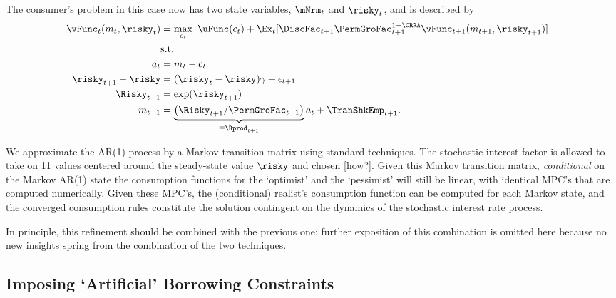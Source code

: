 \documentclass[titlepage, headings=optiontotocandhead]{\econtex}
\begin{document}
The consumer's problem in this case now has two state variables, $\mNrm_{t}$ and $\risky_{t}$, and 
is described by
\begin{equation}\begin{gathered}\begin{aligned}
      \null{\vFunc}_{t}({m}_{t},\risky_{t})  & = \max_{{c}_{t}} ~ \uFunc({c}_{t})+
      \Ex_{t}[{\DiscFac}_{t+1}\PermGroFac_{t+1}^{1-\CRRA}\null{\vFunc}_{t+1}({m}_{t+1},\risky_{t+1})] \label{vtNormRisky}
      \\         & \text{s.t.} &   \nonumber \\
      {a}_{t}    & = {m}_{t}-{c}_{t} \nonumber
      \\      \risky_{t+1}-\risky  & = (\risky_{t}-\risky)\gamma + \epsilon_{t+1} \notag
      \\      \Risky_{t+1}  & = \exp(\risky_{t+1}) \notag
      \\      {m}_{t+1}  & = \underbrace{\left(\Risky_{t+1}/\PermGroFac_{t+1}\right)}_{\equiv \Rprod_{t+1}}{a}_{t}+\TranShkEmp_{t+1} \nonumber.
    \end{aligned}\end{gathered}\end{equation}


We approximate the AR(1) process by a Markov transition matrix using standard techniques.  The stochastic interest factor is allowed to take 
on 11 values centered around the steady-state value $\risky$ and chosen [how?].  Given this Markov transition matrix,
\textit{conditional} on the Markov AR(1) state the consumption functions for the `optimist' and the `pessimist' will still be linear, 
with identical MPC's that are computed numerically.  Given these MPC's, the (conditional) realist's consumption function can be computed for each Markov state, and the converged consumption rules constitute the solution contingent on the dynamics of the stochastic
interest rate process.  

In principle, this refinement should be combined with the previous one;
further exposition of this combination is omitted here because no new
insights spring from the combination of the two techniques.



\hypertarget{Imposing-Artificial-Borrowing-Constraints}{}
\subsection{Imposing `Artificial' Borrowing Constraints}
\end{document}
